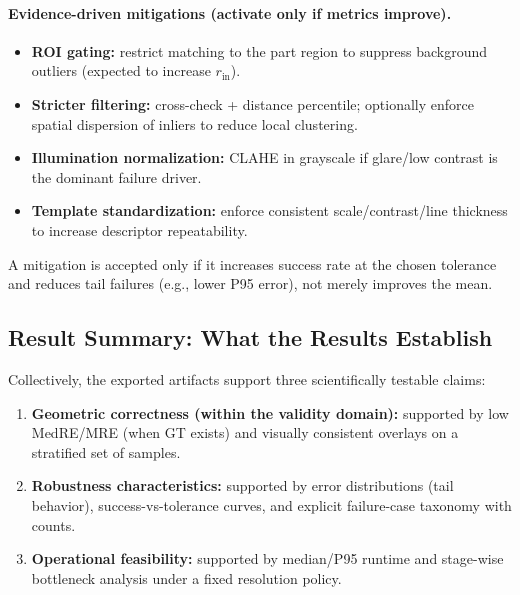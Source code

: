 \paragraph{Evidence-driven mitigations (activate only if metrics improve).}
\begin{itemize}
  \item \textbf{ROI gating:} restrict matching to the part region to suppress background outliers (expected to increase $r_{\text{in}}$).
  \item \textbf{Stricter filtering:} cross-check + distance percentile; optionally enforce spatial dispersion of inliers to reduce local clustering.
  \item \textbf{Illumination normalization:} CLAHE in grayscale if glare/low contrast is the dominant failure driver.
  \item \textbf{Template standardization:} enforce consistent scale/contrast/line thickness to increase descriptor repeatability.
\end{itemize}
A mitigation is accepted only if it increases success rate at the chosen tolerance and reduces tail failures (e.g., lower P95 error), not merely improves the mean.

\subsection{Result Summary: What the Results Establish}
Collectively, the exported artifacts support three scientifically testable claims:

\begin{enumerate}
  \item \textbf{Geometric correctness (within the validity domain):}
  supported by low MedRE/MRE (when GT exists) and visually consistent overlays on a stratified set of samples.

  \item \textbf{Robustness characteristics:}
  supported by error distributions (tail behavior), success-vs-tolerance curves, and explicit failure-case taxonomy with counts.

  \item \textbf{Operational feasibility:}
  supported by median/P95 runtime and stage-wise bottleneck analysis under a fixed resolution policy.
\end{enumerate}

